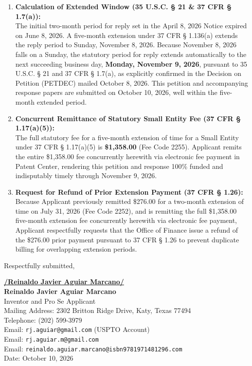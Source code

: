 \documentclass[11pt,letterpaper]{article}
\begin{document}
\begin{enumerate}[leftmargin=*]
    \item \textbf{Calculation of Extended Window (35 U.S.C. \S{} 21 \& 37 CFR \S{} 1.7(a)):} \\
    The initial two-month period for reply set in the April 8, 2026 Notice expired on June 8, 2026. A five-month extension under 37 CFR \S{} 1.136(a) extends the reply period to Sunday, November 8, 2026. Because November 8, 2026 falls on a Sunday, the statutory period for reply extends automatically to the next succeeding business day, \textbf{Monday, November 9, 2026}, pursuant to 35 U.S.C. \S{} 21 and 37 CFR \S{} 1.7(a), as explicitly confirmed in the Decision on Petition (PETDEC) mailed October 8, 2026. This petition and accompanying response papers are submitted on October 10, 2026, well within the five-month extended period.

    \item \textbf{Concurrent Remittance of Statutory Small Entity Fee (37 CFR \S{} 1.17(a)(5)):} \\
    The full statutory fee for a five-month extension of time for a Small Entity under 37 CFR \S{} 1.17(a)(5) is \textbf{\$1,358.00} (Fee Code 2255). Applicant remits the entire \$1,358.00 fee concurrently herewith via electronic fee payment in Patent Center, rendering this petition and response 100\% funded and indisputably timely through November 9, 2026.

    \item \textbf{Request for Refund of Prior Extension Payment (37 CFR \S{} 1.26):} \\
    Because Applicant previously remitted \$276.00 for a two-month extension of time on July 31, 2026 (Fee Code 2252), and is remitting the full \$1,358.00 five-month extension fee concurrently herewith via electronic fee payment, Applicant respectfully requests that the Office of Finance issue a refund of the \$276.00 prior payment pursuant to 37 CFR \S{} 1.26 to prevent duplicate billing for overlapping extension periods.
\end{enumerate}

\vspace{0.6cm}
\begin{singlespace}
\noindent Respectfully submitted, \par\vspace{0.8cm}
\underline{\textbf{/Reinaldo Javier Aguiar Marcano/}} \\
\textbf{Reinaldo Javier Aguiar Marcano} \\
Inventor and Pro Se Applicant \\
Mailing Address: 2302 Britton Ridge Drive, Katy, Texas 77494 \\
Telephone: (202) 599-3979 \\
Email: \texttt{rj.aguiar@gmail.com} (USPTO Account) \\
Email: \texttt{rj.aguiar.m@gmail.com} \\
Email: \texttt{reinaldo.aguiar.marcano@isbn9781971481296.com} \\
Date: October 10, 2026
\end{singlespace}
\end{document}
